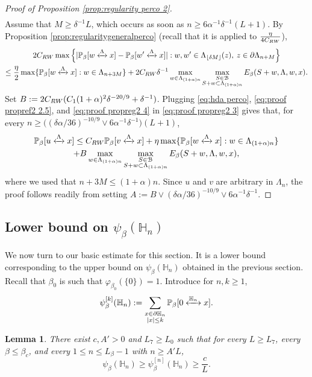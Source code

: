 \documentclass[11pt,a4paper]{article}
\numberwithin{equation}{section}
\theoremstyle{plain}
\newtheorem{Lem}[Thm]{Lemma}
\theoremstyle{definition}
\newcommand{\connect}{\xleftrightarrow}
\begin{document}
\begin{proof}[Proof of Proposition \textup{\ref{prop:regularity perco 2}}]
\begin{multline}
\end{multline}
Assume that $M\geq \delta^{-1}L$, which occurs as soon as $n\geq 6\alpha^{-1}\delta^{-1}(L+1)$. By Proposition \ref{prop:regularitygeneralperco} (recall that it is applied to $\tfrac{\eta}{4C_{\rm RW}}$),
\begin{multline}\label{eq:proof propreg2 4}
	2C_{\rm RW}\max \Big\{|\mathbb P_\beta[w\connect{\Lambda\:}x]-\mathbb P_\beta[w'\connect{\Lambda\:}x]|: w,w'\in \Lambda_{\lfloor \delta M\rfloor}(z), \: z\in \partial \Lambda_{n+M}\Big\}\\\leq \frac{\eta}{2}\max\{\mathbb P_\beta[w\connect{\Lambda\:}x]: w \in \Lambda_{n+3M}\}+2C_{\rm RW}\delta^{-1}\max_{w\in \Lambda_{(1+\alpha)n}}\max_{\substack{S\in \mathcal B\\S+w\subset \Lambda_{(1+\alpha)n}}}{E}_\beta(S+w, \Lambda,w,x).
\end{multline}
Set $B:=2C_{\rm RW}(C_1(1+\alpha)^2\delta^{-20/9}+\delta^{-1})$. 
Plugging \eqref{eq:hda perco}, \eqref{eq:proof propref2 2.5}, and \eqref{eq:proof propreg2 4} in \eqref{eq:proof propreg2 3} gives that, for every $n\geq \Big((\delta\alpha/36)^{-10/9}\vee 6\alpha^{-1}\delta^{-1}\Big)(L+1)$,
\begin{multline}
	\mathbb P_\beta[u\connect{\Lambda\:}x]\leq C_{\rm RW}\mathbb P_\beta[v\connect{\Lambda\:}x]+\eta\max\{\mathbb P_\beta[w\connect{\Lambda\:}x]:w\in \Lambda_{(1+\alpha)n}\}
	\\+B\max_{w\in \Lambda_{(1+\alpha)n}}\max_{\substack{S\in \mathcal B\\S+w\subset \Lambda_{(1+\alpha)n}}}{E}_\beta(S+w, \Lambda,w,x),
\end{multline}
where we used that $n+3M\leq (1+\alpha)n$. Since $u$ and $v$ are arbitrary in $\Lambda_n$, the proof follows readily from setting $A:=B\vee (\delta\alpha/36)^{-10/9}\vee 6\alpha^{-1}\delta^{-1}$.
 \end{proof}


\subsection{Lower bound on $\psi_\beta(\mathbb H_n)$}
We now turn to our basic estimate for this section. It is a lower bound corresponding to the upper bound on $\psi_\beta(\mathbb H_n)$ obtained in the previous section. Recall that $\beta_0$ is such that $\varphi_{\beta_0}(\{0\})=1$. Introduce for $n,k\geq 1$,
\begin{equation}
	\psi^{[k]}_\beta(\mathbb H_n):=\sum_{\substack{x\in \partial \mathbb H_n\\|x|\leq k}}\mathbb P_\beta[0\connect{\mathbb H_n\:}x].
\end{equation}
\begin{Lem}\label{lem: petit lemme} There exist $c,A'>0$ and $L_7\geq L_0$ such that for every $L\geq L_7$, every $\beta\le\beta_c$, and every $1\le n\le L_\beta-1$ with $n\geq A'L$,
\begin{equation}
\psi_\beta(\mathbb H_n)\geq\psi_\beta^{[n]}(\mathbb H_n)\ge \frac{c}{L}.
\end{equation}
\end{Lem}
\end{document}
